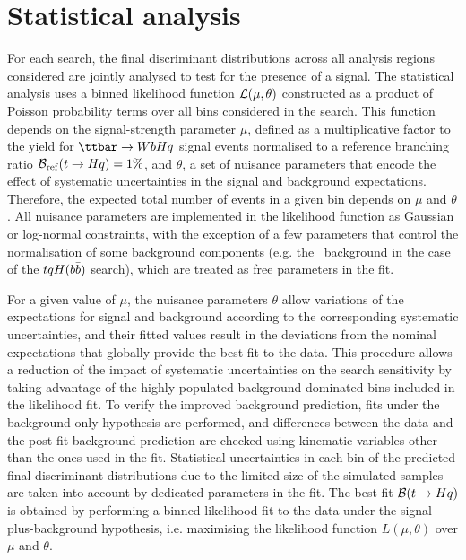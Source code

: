\section{Statistical analysis}
\label{sec:stat_analysis}

For each search, the final discriminant distributions across all analysis regions considered are jointly analysed to test for the 
presence of a signal. The statistical analysis uses a binned likelihood function ${\cal L}(\mu,\theta)$ constructed as
a product of Poisson probability terms over all bins considered in the search. This function depends
on the signal-strength parameter $\mu$, defined as a multiplicative factor to the yield for $\Hq$ signal events
normalised to a reference branching ratio $\mathcal{B}_{\mathrm{ref}}(t\to Hq)=1\%$,
and $\theta$, a set of nuisance parameters that encode the effect of systematic uncertainties in the signal and background expectations. 
Therefore, the expected total number of events in a given bin depends on $\mu$ and $\theta$. 
All nuisance parameters are implemented in the likelihood function as Gaussian or log-normal constraints, with the exception of a few parameters 
that control the normalisation of some background components (e.g. the \ttbin\ background in the case of the $tqH(b\bar{b})$ search), which 
are treated as free parameters in the fit.

For a given value of $\mu$, the nuisance parameters $\theta$ allow variations of the expectations for signal and background
according to the corresponding systematic uncertainties, and their fitted values result in the deviations from
the nominal expectations that globally provide the best fit to the data.
This procedure allows a reduction of the impact of systematic uncertainties on 
the search sensitivity by taking advantage of the highly populated background-dominated bins included in the likelihood fit.
To verify the improved background prediction, fits under the background-only hypothesis are performed, 
and differences between the data and the post-fit background prediction are checked 
using kinematic variables other than the ones used in the fit. 
Statistical uncertainties in each bin of the predicted final discriminant distributions due to the limited size of the simulated samples 
are taken into account by dedicated parameters in the fit.     
The best-fit $\mathcal{B}(t\to Hq)$ is obtained by performing a binned likelihood fit to the data under the signal-plus-background
hypothesis, i.e. maximising the likelihood function $L(\mu,\theta)$ over $\mu$ and $\theta$.

